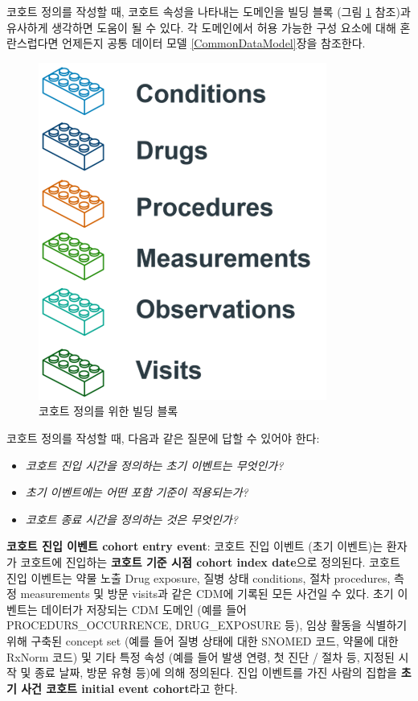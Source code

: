 \documentclass[10.5pt]{book}
\providecommand{\tightlist}{%
  \setlength{\itemsep}{0pt}\setlength{\parskip}{0pt}}
\theoremstyle{definition}
\theoremstyle{definition}
\theoremstyle{definition}
\theoremstyle{remark}
\begin{document}
코호트 정의를 작성할 때, 코호트 속성을 나타내는 도메인을 빌딩 블록 (그림
\ref{fig:cohortLegos} 참조)과 유사하게 생각하면 도움이 될 수 있다. 각
도메인에서 허용 가능한 구성 요소에 대해 혼란스럽다면 언제든지 공통
데이터 모델 \ref{CommonDataModel}장을 참조한다.

\begin{figure}

{\centering \includegraphics[width=0.5\linewidth]{images/Cohorts/cohort-legos} 

}

\caption{코호트 정의를 위한 빌딩 블록}\label{fig:cohortLegos}
\end{figure}

코호트 정의를 작성할 때, 다음과 같은 질문에 답할 수 있어야 한다:

\begin{itemize}
\tightlist
\item
  \emph{코호트 진입 시간을 정의하는 초기 이벤트는 무엇인가?}
\item
  \emph{초기 이벤트에는 어떤 포함 기준이 적용되는가?}
\item
  \emph{코호트 종료 시간을 정의하는 것은 무엇인가?}
\end{itemize}

\textbf{코호트 진입 이벤트 cohort entry event}: 코호트 진입 이벤트 (초기
이벤트)는 환자가 코호트에 진입하는 \textbf{코호트 기준 시점 cohort index
date}으로 정의된다. 코호트 진입 이벤트는 약물 노출 Drug exposure, 질병
상태 conditions, 절차 procedures, 측정 measurements 및 방문 visits과
같은 CDM에 기록된 모든 사건일 수 있다. 초기 이벤트는 데이터가 저장되는
CDM 도메인 (예를 들어 PROCEDURS\_OCCURRENCE, DRUG\_EXPOSURE 등), 임상
활동을 식별하기 위해 구축된 concept set (예를 들어 질병 상태에 대한
SNOMED 코드, 약물에 대한 RxNorm 코드) 및 기타 특정 속성 (예를 들어 발생
연령, 첫 진단 / 절차 등, 지정된 시작 및 종료 날짜, 방문 유형 등)에 의해
정의된다. 진입 이벤트를 가진 사람의 집합을 \textbf{초기 사건 코호트
initial event cohort}라고 한다. 
\end{document}
